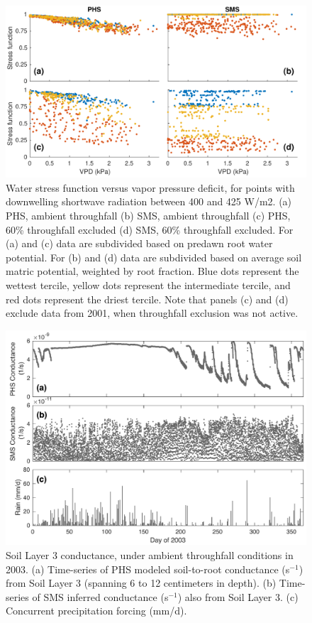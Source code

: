 \documentclass[draft,linenumbers]{agujournal}
\begin{document}
      \clearpage
    \begin{figure}[h]
     \centering
     \includegraphics[width=30pc]{../figs2/fig5.pdf}
     \caption{Water stress function versus vapor pressure deficit, for points with downwelling shortwave radiation between 400 and 425 W/m2.
     (a) PHS, ambient throughfall
     (b) SMS, ambient throughfall
     (c) PHS, 60\% throughfall excluded
     (d) SMS, 60\% throughfall excluded. 
     For (a) and (c) data are subdivided based on predawn root water potential.
     For (b) and (d) data are subdivided based on average soil matric potential, weighted by root fraction.
     Blue dots represent the wettest tercile, yellow dots represent the intermediate tercile, and red dots represent the driest tercile.
     Note that panels (c) and (d) exclude data from 2001, when throughfall exclusion was not active.
     }
     \label{fig:vpd}
       \end{figure}
  
  
\clearpage   
  \begin{figure}[h]
     \centering
     \includegraphics[width=30pc]{../figs2/fig6.pdf}
     \caption{Soil Layer 3 conductance, under ambient throughfall conditions in 2003. 
     (a) Time-series of PHS modeled soil-to-root conductance (s$^{-1}$) from Soil Layer 3 (spanning 6 to 12 centimeters in depth).
     (b) Time-series of SMS inferred conductance (s$^{-1}$) also from Soil Layer 3.
     (c) Concurrent precipitation forcing (mm/d).
     }
     \label{fig:cond}
  \end{figure}
  
\end{document}
